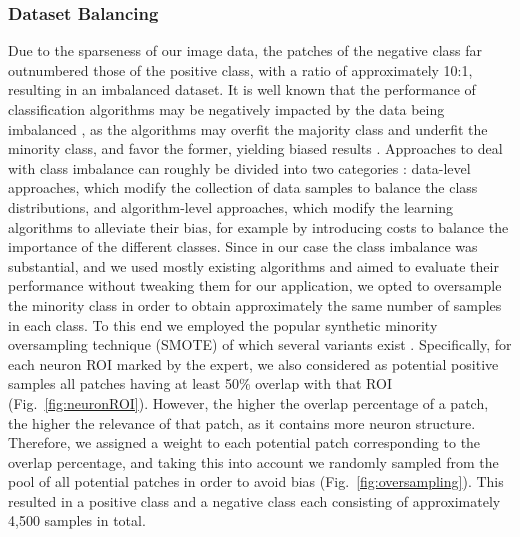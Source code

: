 \subsubsection{Dataset Balancing}
\label{sec:balanced}

Due to the sparseness of our image data, the patches of the negative class far outnumbered those of the positive class, with a ratio of approximately 10:1, resulting in an imbalanced dataset. It is well known that the performance of classification algorithms may be negatively impacted by the data being imbalanced \cite{chawla2004editorial, daskalaki2006evaluation, forman2010apples, branco2016survey}, as the algorithms may overfit the majority class and underfit the minority class, and favor the former, yielding biased results \cite{garcia2014bias, li2018adaptive}. Approaches to deal with class imbalance can roughly be divided into two categories \cite{he2008learning, Krawczyk-2016, Haixiang-2017}: data-level approaches, which modify the collection of data samples to balance the class distributions, and algorithm-level approaches, which modify the learning algorithms to alleviate their bias, for example by introducing costs to balance the importance of the different classes. Since in our case the class imbalance was substantial, and we used mostly existing algorithms and aimed to evaluate their performance without tweaking them for our application, we opted to oversample the minority class in order to obtain approximately the same number of samples in each class. To this end we employed the popular synthetic minority oversampling technique (SMOTE) \cite{Chawla:2002:SSM:1622407.1622416} of which several variants exist \cite{Saez2015, Krawczyk-2016, Gosain2017}. Specifically, for each neuron ROI marked by the expert, we also considered as potential positive samples all patches having at least 50\% overlap with that ROI (Fig.~\ref{fig:neuronROI}). However, the higher the overlap percentage of a patch, the higher the relevance of that patch, as it contains more neuron structure. Therefore, we assigned a weight to each potential patch corresponding to the overlap percentage, and taking this into account we randomly sampled from the pool of all potential patches in order to avoid bias (Fig.~\ref{fig:oversampling}). This resulted in a positive class and a negative class each consisting of approximately 4,500 samples in total.

